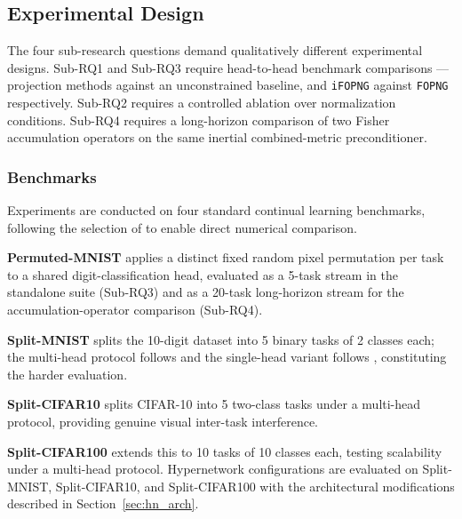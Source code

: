 
\subsection{Experimental Design}
\label{sec:experimental_design}

The four sub-research questions demand qualitatively different experimental
designs. Sub-RQ1 and Sub-RQ3 require head-to-head benchmark comparisons ---
projection methods against an unconstrained baseline, and \texttt{iFOPNG}
against \texttt{FOPNG} respectively. Sub-RQ2 requires a controlled ablation
over normalization conditions. Sub-RQ4 requires a long-horizon comparison of
two Fisher accumulation operators on the same inertial combined-metric preconditioner.
\subsubsection{Benchmarks}
\label{sec:benchmarks}

Experiments are conducted on four standard continual learning benchmarks,
following the selection of \citet{garg_fisher-orthogonal_2026} to enable
direct numerical comparison.

\textbf{Permuted-MNIST} \citep{kirkpatrick_overcoming_2017} applies a distinct
fixed random pixel permutation per task to a shared digit-classification head,
evaluated as a 5-task stream in the standalone suite (Sub-RQ3) and as a
20-task long-horizon stream for the accumulation-operator comparison (Sub-RQ4).

\textbf{Split-MNIST} splits the 10-digit dataset into 5 binary tasks of
2 classes each; the multi-head protocol follows \citet{zenke_continual_2017}
and the single-head variant follows \citet{ven_three_2019}, constituting the
harder evaluation.

\textbf{Split-CIFAR10} \citep{zenke_continual_2017} splits CIFAR-10 into
5 two-class tasks under a multi-head protocol, providing genuine visual
inter-task interference.

\textbf{Split-CIFAR100} \citep{zenke_continual_2017} extends this to 10
tasks of 10 classes each, testing scalability under a multi-head protocol.
Hypernetwork configurations are evaluated on Split-MNIST, Split-CIFAR10,
and Split-CIFAR100 with the architectural modifications described in
Section~\ref{sec:hn_arch}.

